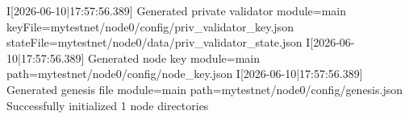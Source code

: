 \begin{shellbox}\begin{ttlst}
I[2026-06-10|17:57:56.389] Generated private validator                  module=main keyFile=mytestnet/node0/config/priv_validator_key.json stateFile=mytestnet/node0/data/priv_validator_state.json
I[2026-06-10|17:57:56.389] Generated node key                           module=main path=mytestnet/node0/config/node_key.json
I[2026-06-10|17:57:56.389] Generated genesis file                       module=main path=mytestnet/node0/config/genesis.json
Successfully initialized 1 node directories
\end{ttlst}\end{shellbox}
